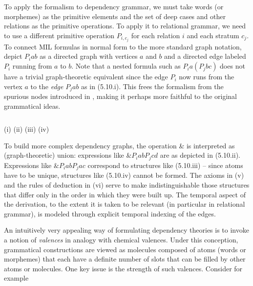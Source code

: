 To apply the formalism to dependency grammar, we must take words (or
morphemes) as the primitive elements and the set of deep cases and other
relations as the primitive operations. To apply it to relational grammar, we
need to use a different primitive operation $P_{i,c_j}$ for each relation $i$
and each stratum $c_j$. To connect MIL formulas in normal form to the more
standard graph notation, depict $P_iab$ as a directed graph with vertices $a$
and $b$ and a directed edge labeled $P_i$ running from $a$ to $b$. Note that
a nested formula such as $P_ia(P_jbc)$ does not have a trivial graph-theoretic
equivalent since the edge $P_i$ now runs from the vertex $a$ to the {\it
edge} $P_jab$ as in (5.10.i). This frees the formalism from the spurious nodes
introduced in , making it perhaps more faithful to the
original grammatical ideas. 

\begin{equation}
\end{equation}

\noindent
(i)\vbox{}%
\hbox{\phantom{ww}}(ii)%
\vbox{}\phantom{ww}(iii)%
\vbox{}\phantom{ww}(iv)%
\vbox{}

\medskip
\noindent
To build more complex dependency graphs, the operation \& is interpreted as
(graph-theoretic) union: expressions like $\&P_iabP_jcd$ are as depicted in
(5.10.ii).  Expressions like $\&P_iabP_jac$ correspond to structures like
(5.10.iii) -- since atoms have to be unique, structures like (5.10.iv) cannot
be formed.  The axioms in (v) and the rules of deduction in (vi) serve to make
indistinguishable those structures that differ only in the order in which they
were built up. The temporal aspect of the derivation, to the extent it is
taken to be relevant (in particular in relational grammar), is modeled through
explicit temporal indexing of the edges.

An intuitively very appealing way of formulating dependency theories is to
invoke a notion of {\it valences} in analogy with chemical valences.
 Under this conception, grammatical constructions are viewed as
molecules composed of atoms (words or morphemes) that each have a definite
number of slots that can be filled by other atoms or molecules. One key issue
is the strength of such valences. Consider for example

